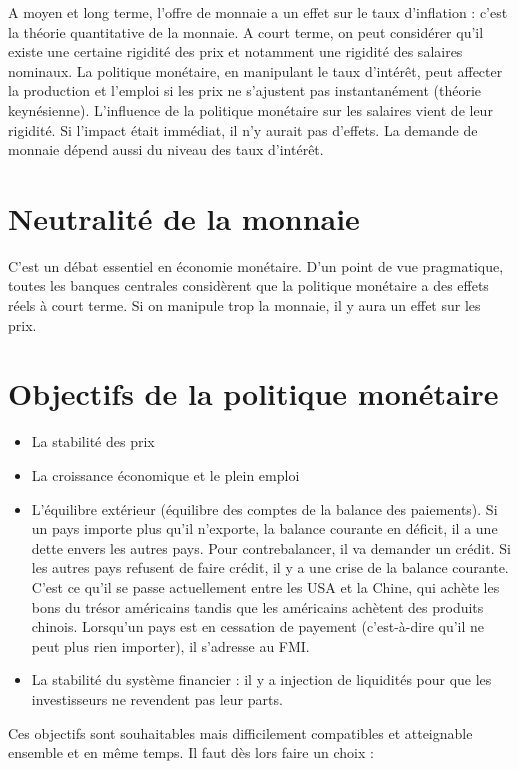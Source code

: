 	A moyen et long terme, l'offre de monnaie a un effet sur le taux d'inflation : c'est la théorie quantitative de la monnaie.	A court terme, on peut considérer qu'il existe une certaine rigidité des prix et notamment une rigidité des salaires nominaux. La politique monétaire, en manipulant le taux d'intérêt, peut affecter la production et l'emploi si les prix ne s'ajustent pas instantanément (théorie keynésienne). L'influence de la politique monétaire sur les salaires vient de leur rigidité. Si l'impact était immédiat, il n'y aurait pas d'effets.	La demande de monnaie dépend aussi du niveau des taux d'intérêt.
	
\section{Neutralité de la monnaie}

C'est un débat essentiel en économie monétaire. D'un point de vue pragmatique, toutes les banques centrales considèrent que la politique monétaire a des effets réels à court terme. Si on manipule trop la monnaie, il y aura un effet sur les prix.

\section{Objectifs de la politique monétaire}

\begin{itemize}
	\item La stabilité des prix
	\item La croissance économique et le plein emploi
	\item L'équilibre extérieur (équilibre des comptes de la balance des paiements). Si un pays importe plus qu'il n'exporte, la balance courante en déficit, il a une dette envers les autres pays. Pour contrebalancer, il va demander un crédit. Si les autres pays refusent de faire crédit, il y a une crise de la balance courante. C'est ce qu'il se passe actuellement entre les USA et la Chine, qui achète les bons du trésor américains tandis que les américains achètent des produits chinois. Lorsqu'un pays est en cessation de payement (c'est-à-dire qu'il ne peut plus rien importer), il s'adresse au FMI.
	\item La stabilité du système financier : il y a injection de liquidités pour que les investisseurs ne revendent pas leur parts.
\end{itemize}

Ces objectifs sont souhaitables mais difficilement compatibles et atteignable ensemble et en même temps. Il faut dès lors faire un choix :

